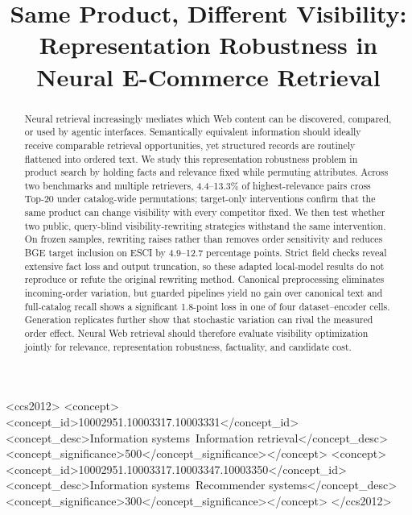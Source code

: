 \documentclass[sigconf,anonymous,review]{acmart}
\title{Same Product, Different Visibility: Representation Robustness in Neural E-Commerce Retrieval}
\begin{document}
\raggedbottom
\begin{abstract}
Neural retrieval increasingly mediates which Web content can be discovered, compared, or used by agentic interfaces. Semantically equivalent information should ideally receive comparable retrieval opportunities, yet structured records are routinely flattened into ordered text. We study this representation robustness problem in product search by holding facts and relevance fixed while permuting attributes. Across two benchmarks and multiple retrievers, 4.4--13.3\% of highest-relevance pairs cross Top-20 under catalog-wide permutations; target-only interventions confirm that the same product can change visibility with every competitor fixed. We then test whether two public, query-blind visibility-rewriting strategies withstand the same intervention. On frozen samples, rewriting raises rather than removes order sensitivity and reduces BGE target inclusion on ESCI by 4.9--12.7 percentage points. Strict field checks reveal extensive fact loss and output truncation, so these adapted local-model results do not reproduce or refute the original rewriting method. Canonical preprocessing eliminates incoming-order variation, but guarded pipelines yield no gain over canonical text and full-catalog recall shows a significant 1.8-point loss in one of four dataset--encoder cells. Generation replicates further show that stochastic variation can rival the measured order effect. Neural Web retrieval should therefore evaluate visibility optimization jointly for relevance, representation robustness, factuality, and candidate cost.
\end{abstract}

\begin{CCSXML}
<ccs2012>
 <concept><concept_id>10002951.10003317.10003331</concept_id><concept_desc>Information systems~Information retrieval</concept_desc><concept_significance>500</concept_significance></concept>
 <concept><concept_id>10002951.10003317.10003347.10003350</concept_id><concept_desc>Information systems~Recommender systems</concept_desc><concept_significance>300</concept_significance></concept>
</ccs2012>
\end{CCSXML}

\maketitle









\clearpage



\end{document}
